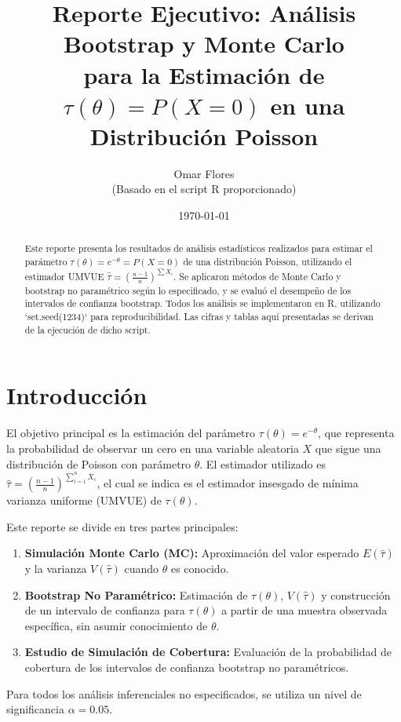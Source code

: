 \documentclass[11pt,a4paper]{article}
\title{Reporte Ejecutivo: Análisis Bootstrap y Monte Carlo \\ para la Estimación de $\tau(\theta) = P(X=0)$ en una Distribución Poisson}
\author{Omar Flores \\ (Basado en el script R proporcionado)}
\date{\today}
\begin{document}
\maketitle
\begin{abstract}
Este reporte presenta los resultados de análisis estadísticos realizados para estimar el parámetro $\tau(\theta) = e^{-\theta} = P(X=0)$ de una distribución Poisson, utilizando el estimador UMVUE $\hat{\tau} = \left(\frac{n-1}{n}\right)^{\sum X_i}$. Se aplicaron métodos de Monte Carlo y bootstrap no paramétrico según lo especificado, y se evaluó el desempeño de los intervalos de confianza bootstrap. Todos los análisis se implementaron en R, utilizando `set.seed(1234)` para reproducibilidad. Las cifras y tablas aquí presentadas se derivan de la ejecución de dicho script.
\end{abstract}

\hrulefill

\hrulefill
\vspace{1em}

\section{Introducción}
El objetivo principal es la estimación del parámetro $\tau(\theta) = e^{-\theta}$, que representa la probabilidad de observar un cero en una variable aleatoria $X$ que sigue una distribución de Poisson con parámetro $\theta$. El estimador utilizado es $\hat{\tau} = \left(\frac{n-1}{n}\right)^{\sum_{i=1}^n X_i}$, el cual se indica es el estimador insesgado de mínima varianza uniforme (UMVUE) de $\tau(\theta)$.

Este reporte se divide en tres partes principales:
\begin{enumerate}
    \item \textbf{Simulación Monte Carlo (MC):} Aproximación del valor esperado $E(\hat{\tau})$ y la varianza $V(\hat{\tau})$ cuando $\theta$ es conocido.
    \item \textbf{Bootstrap No Paramétrico:} Estimación de $\tau(\theta)$, $V(\hat{\tau})$ y construcción de un intervalo de confianza para $\tau(\theta)$ a partir de una muestra observada específica, sin asumir conocimiento de $\theta$.
    \item \textbf{Estudio de Simulación de Cobertura:} Evaluación de la probabilidad de cobertura de los intervalos de confianza bootstrap no paramétricos.
\end{enumerate}
Para todos los análisis inferenciales no especificados, se utiliza un nivel de significancia $\alpha = 0.05$.
\end{document}

